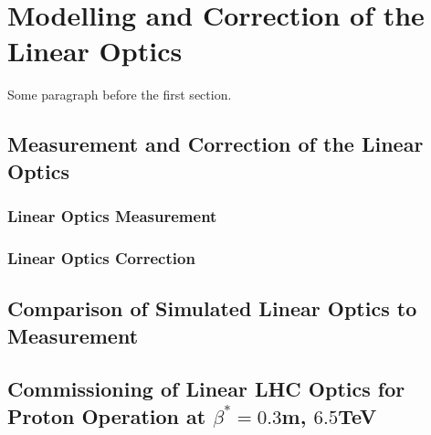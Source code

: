 
\chapter{Modelling and Correction of the Linear Optics} %

\label{Chapter3} %




Some paragraph before the first section.


\section{Measurement and Correction of the Linear Optics}

\subsection{Linear Optics Measurement}

\subsection{Linear Optics Correction}


\section{Comparison of Simulated Linear Optics to Measurement}


\section{Commissioning of Linear LHC Optics for Proton Operation at $\beta^{*} = 0.3$m, $6.5$TeV}

